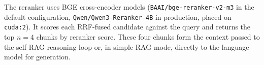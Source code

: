 The reranker uses BGE cross-encoder models (\texttt{BAAI/bge-reranker-v2-m3} in the default configuration, \texttt{Qwen/Qwen3-Reranker-4B} in production, placed on \texttt{cuda:2}). It scores each RRF-fused candidate against the query and returns the top $n=4$ chunks by reranker score. These four chunks form the context passed to the self-RAG reasoning loop or, in simple RAG mode, directly to the language model for generation.
